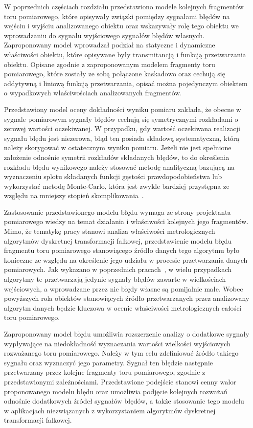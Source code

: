 W poprzednich częściach rozdziału przedstawiono modele kolejnych fragmentów toru pomiarowego, które opisywały związki pomiędzy sygnałami błędów na wejściu i wyjściu analizowanego obiektu oraz wskazywały rolę tego obiektu we wprowadzaniu do sygnału wyjściowego sygnałów błędów własnych. Zaproponowany model wprowadzał podział na statyczne i dynamiczne właściwości obiektu, które opisywane były transmitancją i funkcją przetwarzania obiektu. Opisane zgodnie z zaproponowanym modelem fragmenty toru pomiarowego, które zostały ze sobą połączone kaskadowo oraz cechują się addytywną i liniową funkcją przetwarzania, opisać można pojedynczym obiektem o wypadkowych właściwościach analizowanych fragmentów.

Przedstawiony model oceny dokładności wyniku pomiaru zakłada, że obecne w sygnale pomiarowym sygnały błędów cechują się symetrycznymi rozkładami o zerowej wartości oczekiwanej. W przypadku, gdy wartość oczekiwana realizacji sygnału błędu jest niezerowa, błąd ten posiada składową systematyczną, którą należy skorygować w ostatecznym wyniku pomiaru. Jeżeli nie jest spełnione założenie odnośnie symetrii rozkładów składanych błędów, to do określenia rozkładu błędu wynikowego należy stosować metodę analityczną bazującą na wyznaczeniu splotu składanych funkcji gęstości prawdopodobieństwa lub wykorzystać metodę Monte-Carlo, która jest zwykle bardziej przystępna ze względu na mniejszy stopień skomplikowania~\cite{janssen_montecarlo, roj_annuncertainty}.

Zastosowanie przedstawionego modelu błędu wymaga ze strony projektanta pomiarowego wiedzy na temat działania i właściwości kolejnych jego fragmentów. Mimo, że tematykę pracy stanowi analiza właściwości metrologicznych algorytmów dyskretnej transformacji falkowej, przedstawienie modelu błędu fragmentu toru pomiarowego stanowiącego źródło danych tego algorytmu było konieczne ze względu na określenie jego udziału w procesie przetwarzania danych pomiarowych. Jak wykazano w poprzednich pracach~\cite{auth_window, auth_electronics}, w wielu przypadkach algorytmy te przetwarzają jedynie sygnały błędów zawarte w wielkościach wejściowych, a wprowadzane przez nie błędy własne są pomijalnie małe. Wobec powyższych rola obiektów stanowiących źródło przetwarzanych przez analizowany algorytm danych będzie kluczowa w ocenie właściwości metrologicznych całości toru pomiarowego.

Zaproponowany model błędu umożliwia rozszerzenie analizy o dodatkowe sygnały wypływające na niedokładność wyznaczania wartości wielkości wyjściowych rozważanego toru pomiarowego. Należy w tym celu zdefiniować źródło takiego sygnału oraz wyznaczyć jego parametry. Sygnał ten błędzie następnie przetwarzany przez kolejne fragmenty toru pomiarowego, zgodnie z przedstawionymi zależnościami. Przedstawione podejście stanowi cenny walor proponowanego modelu błędu oraz umożliwia podjęcie kolejnych rozważań odnośnie dodatkowych źródeł sygnałów błędów, a także stosowanie tego modelu w aplikacjach niezwiązanych z wykorzystaniem algorytmów dyskretnej transformacji falkowej.

